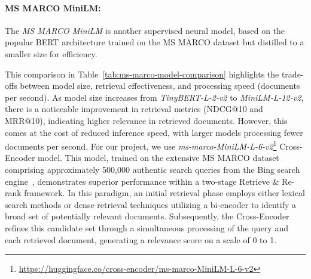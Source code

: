 \paragraph{MS MARCO MiniLM:}
The \textit{MS MARCO MiniLM} is another supervised neural model, based on the popular BERT architecture trained on the MS MARCO dataset but distilled to a smaller size for efficiency.
\begin{table}[ht!]
    \centering
    \noindent
    \caption{Performance comparison of various distilled MS MARCO models based on BERT architecture, measured across NDCG@10 on TREC DL 2019 and MRR@10 on MS MARCO Dev benchmarks.}
    \label{tab:ms-marco-model-comparison}
\end{table}
This comparison in Table~\ref{tab:ms-marco-model-comparison} highlights the trade-offs between model size, retrieval effectiveness, and processing speed (documents per second).
As model size increases from \textit{TinyBERT-L-2-v2} to \textit{MiniLM-L-12-v2}, there is a noticeable improvement in retrieval metrics (NDCG@10 and MRR@10), indicating higher relevance in retrieved documents.
However, this comes at the cost of reduced inference speed, with larger models processing fewer documents per second.
For our project, we use \textit{ms-marco-MiniLM-L-6-v2}\footnote{\url{https://huggingface.co/cross-encoder/ms-marco-MiniLM-L-6-v2}} Cross-Encoder model.
This model, trained on the extensive MS MARCO dataset comprising approximately 500,000 authentic search queries from the Bing search engine~\cite{reimers-2019-sentence-bert}, demonstrates superior performance within a two-stage Retrieve \& Re-rank framework.
In this paradigm, an initial retrieval phase employs either lexical search methods or dense retrieval techniques utilizing a bi-encoder to identify a broad set of potentially relevant documents.
Subsequently, the Cross-Encoder refines this candidate set through a simultaneous processing of the query and each retrieved document, generating a relevance score on a scale of 0 to 1.

